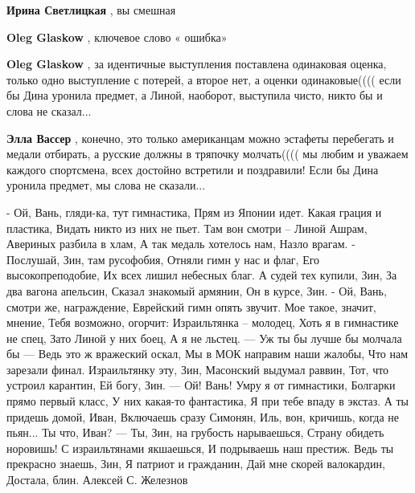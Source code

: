 \begin{itemize}
\begin{itemize}
\textbf{Ирина Светлицкая} , вы смешная

 
\textbf{Oleg Glaskow} , ключевое слово « ошибка»

 
\textbf{Oleg Glaskow} , за идентичные выступления поставлена одинаковая оценка,
только одно выступление с потерей, а второе нет, а оценки одинаковые(((( если
бы Дина уронила предмет, а Линой, наоборот, выступила чисто, никто бы и слова
не сказал...

 
\textbf{Элла Вассер} , конечно, это только американцам можно эстафеты
перебегать и медали отбирать, а русские должны в тряпочку молчать(((( мы любим
и уважаем каждого спортсмена, всех достойно встретили и поздравили! Если бы
Дина уронила предмет, мы слова не сказали...

 

\obeycr
- Ой, Вань, гляди-ка, тут гимнастика,
Прям из Японии идет.
Какая грация и пластика,
Видать никто из них не пьет.
Там вон смотри – Линой Ашрам,
Авериных разбила в хлам,
А так медаль хотелось нам,
Назло врагам.
- Послушай, Зин, там русофобия,
Отняли гимн у нас и флаг,
Его высокопреподобие,
Их всех лишил небесных благ.
А судей тех купили, Зин,
За два вагона апельсин,
Сказал знакомый армянин,
Он в курсе, Зин.
- Ой, Вань, смотри же, награждение,
Еврейский гимн опять звучит.
Мое такое, значит, мнение,
Тебя возможно, огорчит:
Израильтянка – молодец,
Хоть я в гимнастике не спец,
Зато Линой у них боец,
А я не льстец.
— Уж ты бы лучше бы молчала бы —
Ведь это ж вражеский оскал,
Мы в МОК направим наши жалобы,
Что нам зарезали финал.
Израильтянку эту, Зин,
Масонский выдумал раввин,
Тот, что устроил карантин,
Ей богу, Зин.
— Ой! Вань! Умру я от гимнастики,
Болгарки прямо первый класс,
У них какая-то фантастика,
Я при тебе впаду в экстаз.
А ты придешь домой, Иван,
Включаешь сразу Симонян,
Иль, вон, кричишь, когда не пьян...
Ты что, Иван?
— Ты, Зин, на грубость нарываешься,
Страну обидеть норовишь!
С израильтянами якшаешься,
И подрываешь наш престиж.
Ведь ты прекрасно знаешь, Зин,
Я патриот и гражданин,
Дай мне скорей валокардин,
Достала, блин.
Алексей С. Железнов
\restorecr



\end{itemize}
\end{itemize}
